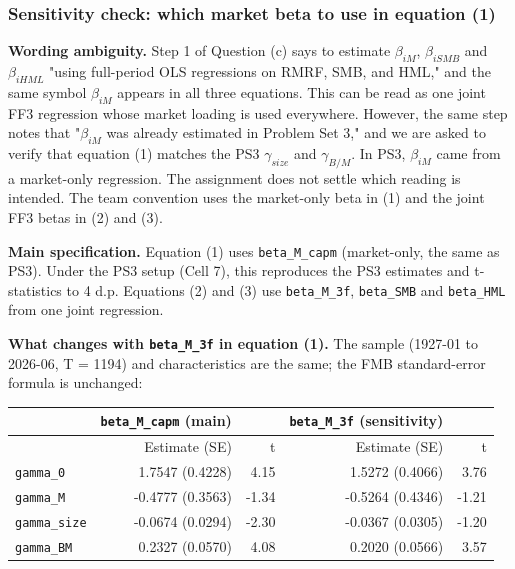 \documentclass[11pt,letterpaper]{article}
\begin{document}
\hypertarget{sensitivity-check-which-market-beta-to-use-in-equation-1}{%
\subsubsection{Sensitivity check: which market beta to use in equation (1)}\label{sensitivity-check-which-market-beta-to-use-in-equation-1}}

\textbf{Wording ambiguity.} Step 1 of Question (c) says to estimate \(\beta_{iM}\), \(\beta_{iSMB}\) and \(\beta_{iHML}\) "using full-period OLS regressions on RMRF, SMB, and HML," and the same symbol \(\beta_{iM}\) appears in all three equations. This can be read as one joint FF3 regression whose market loading is used everywhere. However, the same step notes that "\(\beta_{iM}\) was already estimated in Problem Set 3," and we are asked to verify that equation (1) matches the PS3 \(\gamma_{size}\) and \(\gamma_{B/M}\). In PS3, \(\beta_{iM}\) came from a market-only regression. The assignment does not settle which reading is intended. The team convention uses the market-only beta in (1) and the joint FF3 betas in (2) and (3).

\textbf{Main specification.} Equation (1) uses \texttt{beta\_M\_capm} (market-only, the same as PS3). Under the PS3 setup (Cell 7), this reproduces the PS3 estimates and t-statistics to 4 d.p. Equations (2) and (3) use \texttt{beta\_M\_3f}, \texttt{beta\_SMB} and \texttt{beta\_HML} from one joint regression.

\textbf{What changes with \texttt{beta\_M\_3f} in equation (1).} The sample (1927-01 to 2026-06, T = 1194) and characteristics are the same; the FMB standard-error formula is unchanged:

\begin{center}
\small
\begin{tabular}{lrrrr}
\toprule
 & \texttt{beta\_M\_capm} (main) &  & \texttt{beta\_M\_3f} (sensitivity) &  \\
\midrule
 & Estimate (SE) & t & Estimate (SE) & t \\
\texttt{gamma\_0} & 1.7547 (0.4228) & 4.15 & 1.5272 (0.4066) & 3.76 \\
\texttt{gamma\_M} & -0.4777 (0.3563) & -1.34 & -0.5264 (0.4346) & -1.21 \\
\texttt{gamma\_size} & -0.0674 (0.0294) & -2.30 & -0.0367 (0.0305) & -1.20 \\
\texttt{gamma\_BM} & 0.2327 (0.0570) & 4.08 & 0.2020 (0.0566) & 3.57 \\
\bottomrule
\end{tabular}
\end{center}
\end{document}
